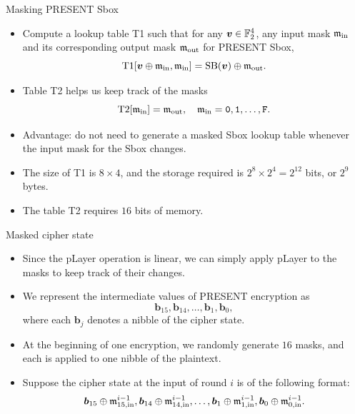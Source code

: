 \begin{frame}{Masking PRESENT Sbox}
    \begin{itemize}
        \item Compute a lookup table T1 such that for any $\boldsymbol{v}\in{\mathbb F}_2^4$, any input mask ${\mathfrak m}_{\text{in}}$ and its corresponding output mask ${\mathfrak m}_{\text{out}}$ for PRESENT Sbox,
\begin{equation*}
    \text{T1}[\boldsymbol{v}\oplus{\mathfrak m}_{\text{in}},{\mathfrak m}_{\text{in}}]=\text{SB}(\boldsymbol{v})\oplus{\mathfrak m}_{\text{out}}.
\end{equation*}
\item Table T2 helps us keep track of the masks
\begin{equation*}
    \text{T2}[{\mathfrak m}_{\text{in}}]={\mathfrak m}_{\text{out}},\quad{\mathfrak m}_{\text{in}}=\texttt{0},\texttt{1},\dots,\texttt{F}.
\end{equation*}
\item Advantage: do not need to generate a masked Sbox lookup table whenever the input mask for the Sbox changes.
\item The size of T1 is $8\times4$, and the storage required is $2^8\times2^4=2^{12}$ bits, or $2^9$ bytes.
\item The table T2 requires $16$ bits of memory.
    \end{itemize}
\end{frame}

\begin{frame}{Masked cipher state}
    \begin{itemize}
        \item Since the pLayer operation is linear, we can simply apply pLayer to the masks to keep track of their changes.
\item We represent the intermediate values of PRESENT encryption as 
\begin{equation*}
    \boldsymbol{b}_{15},\boldsymbol{b}_{14},\dots,\boldsymbol{b}_1,\boldsymbol{b}_0,
\end{equation*}
where each $\boldsymbol{b}_j$ denotes a nibble of the cipher state.
\item At the beginning of one encryption, we randomly generate $16$ masks, and each is applied to one nibble of the plaintext.
\item Suppose the cipher state at the input of round $i$ is of the following format:
\[
\boldsymbol{b}_{15}\oplus{\mathfrak m}^{i-1}_{15,\text{in}},\boldsymbol{b}_{14}\oplus{\mathfrak m}^{i-1}_{14,\text{in}},\dots,\boldsymbol{b}_1\oplus{\mathfrak m}^{i-1}_{1,\text{in}},\boldsymbol{b}_0\oplus{\mathfrak m}^{i-1}_{0,\text{in}}.
\]
    \end{itemize}
\end{frame}


